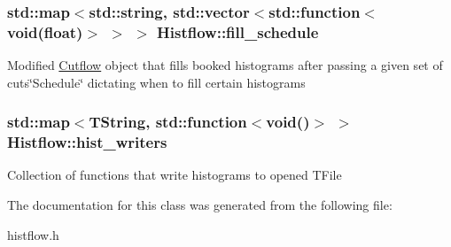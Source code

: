 \subsubsection[{\texorpdfstring{fill\+\_\+schedule}{fill_schedule}}]{\setlength{\rightskip}{0pt plus 5cm}std\+::map$<$std\+::string, std\+::vector$<$std\+::function$<$void(float)$>$ $>$ $>$ Histflow\+::fill\+\_\+schedule\hspace{0.3cm}{\ttfamily [protected]}}\hypertarget{classHistflow_a8440049297c1fc5d0c0f71602a940850}{}\label{classHistflow_a8440049297c1fc5d0c0f71602a940850}
Modified \hyperlink{classCutflow}{Cutflow} object that fills booked histograms after passing a given set of cuts\char`\"{}\+Schedule\char`\"{} dictating when to fill certain histograms 
\subsubsection[{\texorpdfstring{hist\+\_\+writers}{hist_writers}}]{\setlength{\rightskip}{0pt plus 5cm}std\+::map$<$T\+String, std\+::function$<$void()$>$ $>$ Histflow\+::hist\+\_\+writers\hspace{0.3cm}{\ttfamily [protected]}}\hypertarget{classHistflow_ab0e1c8893b1afe8b77c886f6c7c043f4}{}\label{classHistflow_ab0e1c8893b1afe8b77c886f6c7c043f4}
Collection of functions that write histograms to opened T\+File 

The documentation for this class was generated from the following file\+:\begin{DoxyCompactItemize}
\item 
histflow.\+h\end{DoxyCompactItemize}
